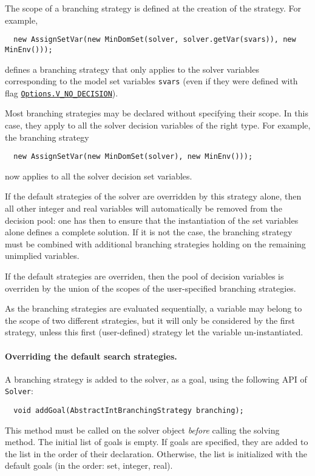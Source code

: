 The scope of a branching strategy is defined at the creation of the strategy. For example,
\begin{lstlisting}
  new AssignSetVar(new MinDomSet(solver, solver.getVar(svars)), new MinEnv()));
\end{lstlisting}
defines a branching strategy that only applies to the solver variables corresponding to the model set variables \texttt{svars} (even if they were defined with flag \hyperlink{vnodecision:vnodecisionoptions}{\tt Options.V\_NO\_DECISION}).

Most branching strategies may be declared without specifying their scope. In this case, they apply to all the solver decision variables of the right type. For example, the branching strategy
\begin{lstlisting}
  new AssignSetVar(new MinDomSet(solver), new MinEnv()));
\end{lstlisting}
now applies to all the solver decision set variables.

If the default strategies of the solver are overridden by this strategy alone, then all other integer and real variables will automatically be removed from the decision pool: one has then to ensure that the instantiation of the set variables alone defines a complete solution.
If it is not the case, the branching strategy must be combined with additional branching strategies holding on the remaining unimplied variables.
\begin{note}
  If the default strategies are overriden, then the pool of decision variables is overriden by the union of the scopes of the user-specified branching strategies.
\end{note}
As the branching strategies are evaluated sequentially, a variable may belong to the scope of two different strategies, but it will only be considered by the first strategy, unless this first (user-defined) strategy let the variable un-instantiated.

\paragraph{Overriding the default search strategies.}
A branching strategy is added to the solver, as a goal, using the following API of \texttt{Solver}:
\begin{lstlisting}
  void addGoal(AbstractIntBranchingStrategy branching);
\end{lstlisting}
This method must be called on the solver object \emph{before} calling the solving method.
The initial list of goals is empty. If goals are specified, they are added to the list in the order of their declaration.
Otherwise, the list is initialized with the default goals (in the order: set, integer, real).


